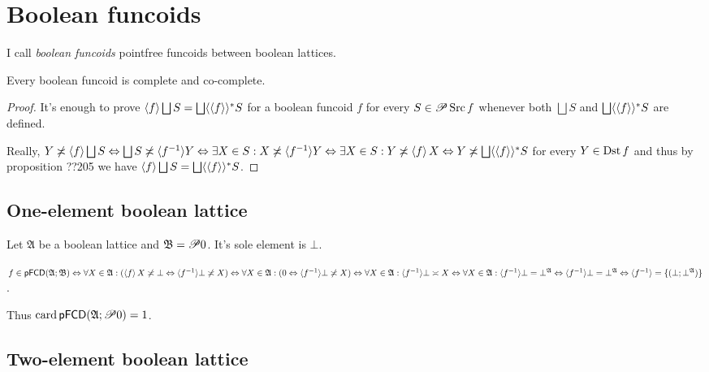 \chapter{Boolean funcoids}

I call \emph{boolean funcoids} pointfree funcoids between boolean lattices.

\begin{prop}
  Every boolean funcoid is complete and co-complete.
\end{prop}

\begin{proof}
  It's enough to prove $\left\langle f\right\rangle \bigsqcup S = \bigsqcup \langle
  \left\langle f\right\rangle \rangle^{\ast} S$ for a boolean funcoid $f$ for every $S
  \in \mathscr{P} \operatorname{Src} f$ whenever both $\bigsqcup S$ and $\bigsqcup
  \langle \left\langle f\right\rangle \rangle^{\ast} S$ are defined.
  
  Really, $Y \not\asymp \left\langle f\right\rangle \bigsqcup S \Leftrightarrow \bigsqcup S
  \not\asymp \langle f^{- 1} \rangle Y \Leftrightarrow \exists X \in S : X
  \not\asymp \langle f^{- 1} \rangle Y \Leftrightarrow \exists X \in S : Y
  \not\asymp \left\langle f\right\rangle X \Leftrightarrow Y \not\asymp \bigsqcup \langle
  \left\langle f\right\rangle \rangle^{\ast} S$ for every $Y \in \operatorname{Dst} f$ and thus
  by proposition ??205 we have $\left\langle f\right\rangle \bigsqcup S = \bigsqcup
  \langle \left\langle f\right\rangle \rangle^{\ast} S$.
\end{proof}

\section{One-element boolean lattice}

Let $\mathfrak{A}$ be a boolean lattice and $\mathfrak{B}= \mathscr{P} 0$.
It's sole element is $\bot$.

$f \in \mathsf{pFCD} (\mathfrak{A}; \mathfrak{B}) \Leftrightarrow \forall X \in
\mathfrak{A}: (\left\langle f\right\rangle X \not\asymp \bot \Leftrightarrow \langle f^{-
1} \rangle \bot \not\asymp X) \Leftrightarrow \forall X \in \mathfrak{A}: (0
\Leftrightarrow \langle f^{- 1} \rangle \bot \not\asymp X) \Leftrightarrow
\forall X \in \mathfrak{A}: \langle f^{- 1} \rangle \bot \asymp X
\Leftrightarrow \forall X \in \mathfrak{A}: \langle f^{- 1} \rangle \bot =
\bot^{\mathfrak{A}} \Leftrightarrow \langle f^{- 1} \rangle \bot =
\bot^{\mathfrak{A}} \Leftrightarrow \langle f^{- 1} \rangle = \{ (\bot ;
\bot^{\mathfrak{A}}) \}$.

Thus $\operatorname{card} \mathsf{pFCD} (\mathfrak{A}; \mathscr{P} 0) = 1$.

\section{Two-element boolean lattice}

